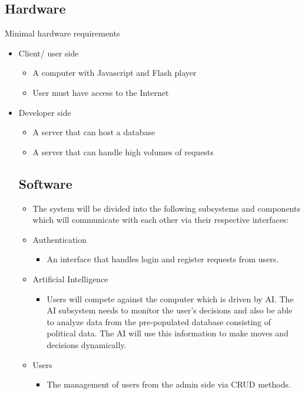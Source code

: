 \documentclass{article}
\begin{document}
    \subsection{Hardware}
    Minimal hardware requirements
	\begin{itemize}
		\item Client/ user side	
		\begin{itemize}
			\item A computer with Javascript and Flash player 
			\item User must have access to the Internet 
		\end{itemize}
		\item Developer side
		\begin{itemize}
			\item A server that can host a database 
			\item A server that can handle high volumes of requests
		\end{itemize}
    \subsection{Software}
    \begin{itemize}
    \item The system will be divided into the following subsystems and components which will communicate with each other via their respective interfaces:

    	\item Authentication  
	    \begin{itemize}
				\item An interface that handles login and register requests from users.
		\end{itemize}

		\item Artificial Intelligence 
   		\begin{itemize}
				\item Users will compete against the computer which is driven by AI. The AI subsystem needs to monitor the user's decisions and also be able to analyze data from the pre-populated database consisting of political data. The AI will use this information to make moves and decisions dynamically.
		\end{itemize}

		\item Users 
		\begin{itemize}
				\item The management of users from the admin side via CRUD methods.   		
		\end{itemize}


\end{itemize}
\end{itemize}
\end{document}
